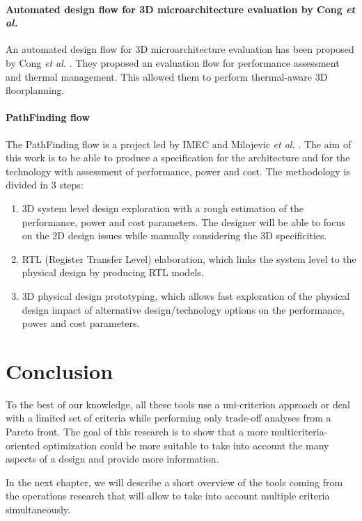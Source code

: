 \paragraph{Automated design flow for 3D microarchitecture evaluation by Cong \textit{et al.}}
An automated design flow for 3D microarchitecture evaluation has been proposed by Cong \textit{et al.} \cite{1594713}. They proposed an evaluation flow for performance assessment and thermal management. This allowed them to perform thermal-aware 3D floorplanning.

\paragraph{PathFinding flow}
The PathFinding flow is a project led by IMEC and Milojevic \textit{et al.} \cite{5335663,DBLP:conf/3dic/MilojevicCCRRSAPM09}. The aim of this work is to be able to produce a specification for the architecture and for the technology with assessment of performance, power and cost. The methodology is divided in 3 steps:
\begin{enumerate}
\item 3D system level design exploration with a rough estimation of the performance, power and cost parameters. The designer will be able to focus on the 2D design issues while manually considering the 3D specificities.
\item RTL (Register Transfer Level) elaboration, which links the system level to the physical design by producing RTL models.
\item 3D physical design prototyping, which allows fast exploration of the physical design impact of alternative design/technology options on the performance, power and cost parameters.
\end{enumerate} 

\section{Conclusion}
To the best of our knowledge, all these tools use a uni-criterion approach or deal with a limited set of criteria while performing only trade-off analyses from a Pareto front. The goal of this research is to show that a more multicriteria-oriented optimization could be more suitable to take into account the many aspects of a design and provide more information.

In the next chapter, we will describe a short overview of the tools coming from the operations research that will allow to take into account multiple criteria simultaneously.